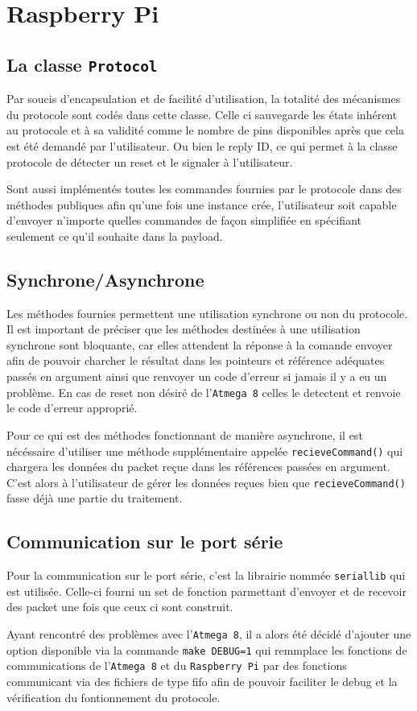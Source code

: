 \section{Raspberry Pi}
\subsection{La classe \texttt{Protocol}}
Par soucis d'encapsulation et de facilité d'utilisation, la totalité des mécanismes du protocole sont codés dans cette classe.
Celle ci sauvegarde les états inhérent au protocole et à sa validité comme le nombre de pins disponibles après que cela est été demandé par l'utilisateur.
Ou bien le reply ID, ce qui permet à la classe protocole de détecter un reset et le signaler à l'utilisateur.

Sont aussi implémentés toutes les commandes fournies par le protocole dans des méthodes publiques afin qu'une fois une instance crée, l'utilisateur soit capable d'envoyer n'importe quelles commandes de façon simplifiée en spécifiant seulement ce qu'il souhaite dans la payload.

\subsection{Synchrone/Asynchrone}
Les méthodes fournies permettent une utilisation synchrone ou non du protocole.
Il est important de préciser que les méthodes destinées à une utilisation synchrone sont bloquante, car elles attendent la réponse à la comande envoyer afin de pouvoir charcher le résultat dans les pointeurs et référence adéquates passés en argument ainsi que renvoyer un code d'erreur si jamais il y a eu un problème. En cas de reset non désiré de l'\texttt{Atmega 8} celles le detectent et renvoie le code d'erreur approprié.

Pour ce qui est des méthodes fonctionnant de manière asynchrone, il est nécéssaire d'utiliser une méthode supplémentaire appelée \texttt{recieveCommand()} qui chargera les données du packet reçue dans les références passées en argument.
C'est alors à l'utilisateur de gérer les données reçues bien que \texttt{recieveCommand()} fasse déjà une partie du traitement.


\subsection{Communication sur le port série}
Pour la communication sur le port série, c'est la librairie nommée \texttt{seriallib} qui est utilisée. Celle-ci fourni un set de fonction parmettant d'envoyer et de recevoir des packet une fois que ceux ci sont construit.
 
Ayant rencontré des problèmes avec l'\texttt{Atmega 8}, il a alors été décidé d'ajouter une option disponible via la commande \texttt{make DEBUG=1} qui remmplace les fonctions de communications de l'\texttt{Atmega 8} et du \texttt{Raspberry Pi} par des fonctions communicant via des fichiers de type fifo afin de pouvoir faciliter le debug et la vérification du fontionnement du protocole.
